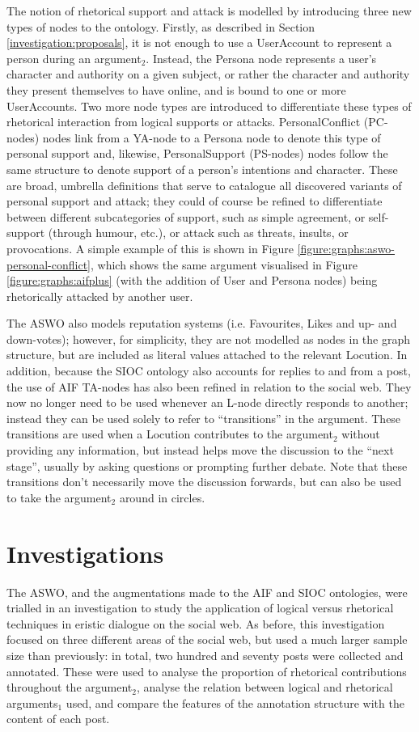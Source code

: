 The notion of rhetorical support and attack is modelled by introducing three new types of nodes to the ontology. Firstly, as described in Section \ref{investigation:proposals}, it is not enough to use a UserAccount to represent a person during an argument$_2$. Instead, the Persona node represents a user's character and authority on a given subject, or rather the character and authority they present themselves to have online, and is bound to one or more UserAccounts. Two more node types are introduced to differentiate these types of rhetorical interaction from logical supports or attacks. PersonalConflict (PC-nodes) nodes link from a YA-node to a Persona node to denote this type of personal support and, likewise, PersonalSupport (PS-nodes) nodes follow the same structure to denote support of a person's intentions and character. These are broad, umbrella definitions that serve to catalogue all discovered variants of personal support and attack; they could of course be refined to differentiate between different subcategories of support, such as simple agreement, or self-support (through humour, etc.), or attack such as threats, insults, or provocations. A simple example of this is shown in Figure \ref{figure:graphs:aswo-personal-conflict}, which shows the same argument visualised in Figure \ref{figure:graphs:aifplus} (with the addition of User and Persona nodes) being rhetorically attacked by another user.


The ASWO also models reputation systems (i.e. Favourites, Likes and up- and down-votes); however, for simplicity, they are not modelled as nodes in the graph structure, but are included as literal values attached to the relevant Locution. In addition, because the SIOC ontology also accounts for replies to and from a post, the use of AIF TA-nodes has also been refined in relation to the social web. They now no longer need to be used whenever an L-node directly responds to another; instead they can be used solely to refer to ``transitions'' in the argument. These transitions are used when a Locution contributes to the argument$_2$ without providing any information, but instead helps move the discussion to the ``next stage'', usually by asking questions or prompting further debate. Note that these transitions don't necessarily move the discussion forwards, but can also be used to take the argument$_2$ around in circles.


\section{Investigations}
The ASWO, and the augmentations made to the AIF and SIOC ontologies, were trialled in an investigation to study the application of logical versus rhetorical techniques in eristic dialogue on the social web. As before, this investigation focused on three different areas of the social web, but used a much larger sample size than previously: in total, two hundred and seventy posts were collected and annotated. These were used to analyse the proportion of rhetorical contributions throughout the argument$_2$, analyse the relation between logical and rhetorical arguments$_1$ used, and compare the features of the annotation structure with the content of each post.


